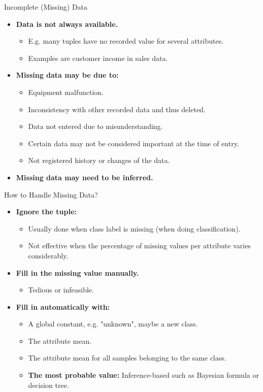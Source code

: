 \begin{frame}{Incomplete (Missing) Data}
	\begin{itemize}
		\item \textbf{Data is not always available.}
		      \begin{itemize}
			      \item E.g. many tuples have no recorded value for several
			            attributes.
			      \item Examples are customer income in sales data.
		      \end{itemize}
		\item \textbf{Missing data may be due to:}
		      \begin{itemize}
			      \item Equipment malfunction.
			      \item Inconsistency with other recorded data and thus deleted.
			      \item Data not entered due to misunderstanding.
			      \item Certain data may not be considered important at the time of
			            entry.
			      \item Not registered history or changes of the data.
		      \end{itemize}
		\item \textbf{Missing data may need to be inferred.}
	\end{itemize}
\end{frame}

\begin{frame}{How to Handle Missing Data?}
	\begin{itemize}
		\item \textbf{Ignore the tuple:}
		      \begin{itemize}
			      \item Usually done when class label is missing (when doing
			            classification).
			      \item Not effective when the percentage of missing values per
			            attribute varies considerably.
		      \end{itemize}
		\item \textbf{Fill in the missing value manually.}
		      \begin{itemize}
			      \item Tedious or infeasible.
		      \end{itemize}
		\item \textbf{Fill in automatically with:}
		      \begin{itemize}
			      \item A global constant, e.g. "unknown", maybe a new class.
			      \item The attribute mean.
			      \item The attribute mean for all samples belonging to the same
			            class.
			      \item \textbf{\color{airforceblue} The most probable value:}
			            Inference-based such as Bayesian formula or decision tree.
		      \end{itemize}
	\end{itemize}
\end{frame}

